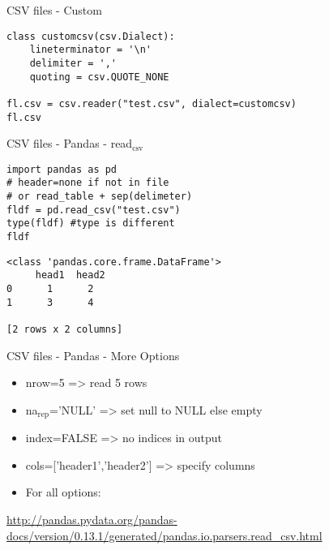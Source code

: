 \documentclass[presentation]{beamer}
\begin{document}
\begin{frame}[fragile,label=sec-4-1-23]{CSV files - Custom}
 \lstset{numbers=left,language=Python,label= ,caption= }
\begin{lstlisting}
class customcsv(csv.Dialect):
    lineterminator = '\n'
    delimiter = ','
    quoting = csv.QUOTE_NONE

fl.csv = csv.reader("test.csv", dialect=customcsv)
fl.csv
\end{lstlisting}
\end{frame}

\begin{frame}[fragile,label=sec-4-1-24]{CSV files - Pandas - read$_{\text{csv}}$}
 \lstset{numbers=left,language=Python,label= ,caption= }
\begin{lstlisting}
import pandas as pd
# header=none if not in file
# or read_table + sep(delimeter)
fldf = pd.read_csv("test.csv")
type(fldf) #type is different
fldf
\end{lstlisting}

\lstset{numbers=left,language=Python,label= ,caption= }
\begin{lstlisting}
<class 'pandas.core.frame.DataFrame'>
     head1  head2
0      1      2
1      3      4

[2 rows x 2 columns]
\end{lstlisting}
\end{frame}

\begin{frame}[label=sec-4-1-25]{CSV files - Pandas - More Options}
\begin{itemize}
\item nrow=5 => read 5 rows
\item na$_{\text{rep}}$='NULL' => set null to NULL else empty
\item index=FALSE => no indices in output
\item cols=['header1','header2'] => specify columns
\item For all options:
\end{itemize}
\url{http://pandas.pydata.org/pandas-docs/version/0.13.1/generated/pandas.io.parsers.read_csv.html}
\end{frame}
\end{document}
